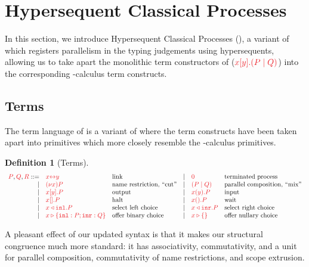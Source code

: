 \documentclass[submission,copyright,creativecommons]{eptcs}
\newtheorem{definition}[lemma]{Definition}
\begin{document}
\section{Hypersequent Classical Processes}
\label{sec:hcp}

In this section, we introduce Hypersequent Classical Processes (\hcp), a variant of \cp which registers parallelism in the typing judgements using hypersequents, allowing us to take apart the monolithic term constructors of \cp (\eg $\tm{\cpSend{x}{y}{P}{Q}}$) into the corresponding \textpi-calculus term constructs.

\subsection{Terms}
The term language of \hcp is a variant of \cp where the term constructs have been taken apart into primitives which more closely resemble the \textpi-calculus primitives.
\begin{definition}[Terms]\label{def:hcp-terms}
  \[
    \begin{array}{rllrll}
      \tm{P}, \tm{Q}, \tm{R}
           ::= & \tm{\cpLink{x}{y}}         &\text{link}
      &  \mid& \tm{\piHalt}               &\text{terminated process}
      \\ \mid& \tm{\piNew{x}{P}}          &\text{name restriction, ``cut''}
      &  \mid& \tm{( \piPar{P}{Q} )}      &\text{parallel composition, ``mix''}
      \\ \mid& \tm{\piBoundSend{x}{y}{P}} &\text{output}
      &  \mid& \tm{\piRecv{x}{y}{P}}      &\text{input}
      \\ \mid& \tm{\piBoundSend{x}{}{P}}  &\text{halt}
      &  \mid& \tm{\cpWait{x}{}{P}}       &\text{wait}
      \\ \mid& \tm{\cpInl{x}{P}}          &\text{select left choice}
      &  \mid& \tm{\cpInr{x}{P}}          &\text{select right choice}
      \\ \mid& \tm{\cpCase{x}{P}{Q}}      &\text{offer binary choice}
      &  \mid& \tm{\cpAbsurd{x}}          &\text{offer nullary choice}
    \end{array}
  \]
\end{definition}\noindent
A pleasant effect of our updated syntax is that it makes our structural congruence much more standard: it has associativity, commutativity, and a unit for parallel composition, commutativity of name restrictions, and scope extrusion.
\end{document}

